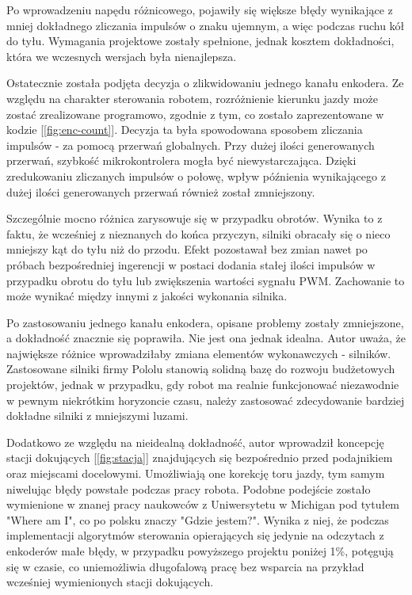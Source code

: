 Po wprowadzeniu napędu różnicowego, pojawiły się większe błędy wynikające z mniej dokładnego zliczania impulsów o znaku ujemnym, a więc podczas ruchu kół do tyłu. Wymagania projektowe zostały spełnione, jednak kosztem dokładności, która we wczesnych wersjach była nienajlepsza. 

\hspace{1cm}

Ostatecznie została podjęta decyzja o zlikwidowaniu jednego kanału enkodera. Ze względu na charakter sterowania robotem, rozróżnienie kierunku jazdy może zostać zrealizowane programowo, zgodnie z tym, co zostało zaprezentowane w kodzie [\ref{fig:enc-count}]. Decyzja ta była spowodowana sposobem zliczania impulsów - za pomocą przerwań globalnych. Przy dużej ilości generowanych przerwań, szybkość mikrokontrolera mogła być niewystarczająca. Dzięki zredukowaniu zliczanych impulsów o połowę, wpływ późnienia wynikającego z dużej ilości generowanych przerwań również został zmniejszony. 

Szczególnie mocno różnica zarysowuje się w przypadku obrotów. Wynika to z faktu, że wcześniej z nieznanych do końca przyczyn, silniki obracały się o nieco mniejszy kąt do tyłu niż do przodu. Efekt pozostawał bez zmian nawet po próbach bezpośredniej ingerencji w postaci dodania stałej ilości impulsów w przypadku obrotu do tyłu lub zwiększenia wartości sygnału PWM. Zachowanie to może wynikać między innymi z jakości wykonania silnika. 

Po zastosowaniu jednego kanału enkodera, opisane problemy zostały zmniejszone, a dokładność znacznie się poprawiła. Nie jest ona jednak idealna. Autor uważa, że największe różnice wprowadziłaby zmiana elementów wykonawczych - silników. Zastosowane silniki firmy Pololu stanowią solidną bazę do rozwoju budżetowych projektów, jednak w przypadku, gdy robot ma realnie funkcjonować niezawodnie w pewnym niekrótkim horyzoncie czasu, należy zastosować zdecydowanie bardziej dokładne silniki z mniejszymi luzami. 

\hspace{1cm}

Dodatkowo ze względu na nieidealną dokładność, autor wprowadził koncepcję stacji dokujących [\ref{fig:stacja}] znajdujących się bezpośrednio przed podajnikiem oraz miejscami docelowymi. Umożliwiają one korekcję toru jazdy, tym samym niwelując błędy powstałe podczas pracy robota. Podobne podejście zostało wymienione w znanej pracy naukowców z Uniwersytetu w Michigan pod tytułem "Where am I", co po polsku znaczy "Gdzie jestem?"\cite{bib:where-am-i}. Wynika z niej, że podczas implementacji algorytmów sterowania opierających się jedynie na odczytach z enkoderów małe błędy, w przypadku powyższego projektu poniżej 1\%, potęgują się w czasie, co uniemożliwia długofalową pracę bez wsparcia na przykład wcześniej wymienionych stacji dokujących.  

